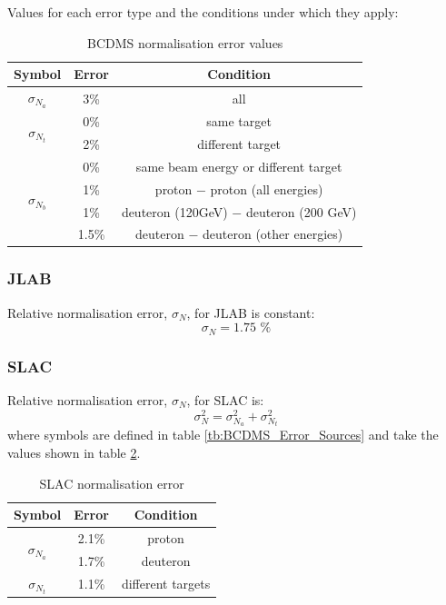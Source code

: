 \documentclass[12pt,a4paper]{report}
\begin{document}
Values for each error type and the conditions under which they apply:
\begin{table}[h]
\begin{center}
\begin{tabular}{|c|c|c|}
\hline
Symbol & Error & Condition\\
\hline
$\sigma_{N_a}$ & 3\% & all \\
\hline
\multirow{2}{*}{$\sigma_{N_t}$} & 0\% & same target \\
\cline{2-3}
& 2\% & different target\\
\hline
\multirow{4}{*}{$\sigma_{N_b}$} & 0\% & same beam energy or different target\\
\cline{2-3}
& 1\% & proton $-$ proton (all energies) \\
\cline{2-3}
& 1\% & deuteron (120GeV) $-$ deuteron (200 GeV) \\
\cline{2-3}
& 1.5\% & deuteron $-$ deuteron (other energies) \\
\hline
\end{tabular}
\caption{BCDMS normalisation error values}
\label{tb:BCDMS_Error_Values}
\end{center}
\end{table}

\subsubsection{JLAB}

Relative normalisation error, $\sigma_N$, for JLAB \cite[pg 486]{JLAB} is constant:
\begin{equation}
\sigma_N = 1.75 \textrm{ \%}
\end{equation}

\subsubsection{SLAC}

Relative normalisation error, $\sigma_N$, for SLAC \cite[pg 476]{Whitlow} is:
\begin{equation}
\sigma_N^2 = \sigma_{N_a}^2 + \sigma_{N_t}^2
\end{equation}
where symbols are defined in table \ref{tb:BCDMS_Error_Sources} and take the values shown in table \ref{tb:SLAC_Error_Values}.
\begin{table}[H]
\begin{center}
\begin{tabular}{|c|c|c|}
\hline
Symbol & Error & Condition\\
\hline
\multirow{2}{*}{$\sigma_{N_a}$} & 2.1\% & proton \\
\cline{2-3}
& 1.7\% & deuteron \\
\hline
$\sigma_{N_t}$ & 1.1\% & different targets \\
\hline
\end{tabular}
\caption{SLAC normalisation error}
\label{tb:SLAC_Error_Values}
\end{center}
\end{table}
\end{document}
